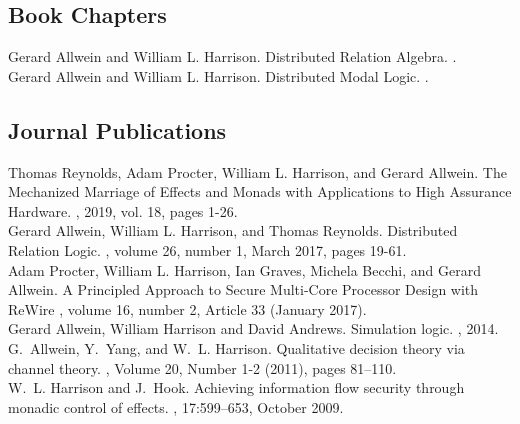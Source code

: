 \documentclass[12pt]{article} %
\begin{document}
\subsection*{Book Chapters}

Gerard Allwein and William L. Harrison.
\newblock Distributed Relation Algebra.
.
\\

Gerard Allwein and William L. Harrison.
\newblock Distributed Modal Logic.
.

\subsection*{Journal Publications}


Thomas Reynolds, Adam Procter, William L. Harrison, and Gerard Allwein.
\newblock The Mechanized Marriage of Effects and Monads with Applications to High Assurance Hardware.
, 2019, vol. 18, pages 1-26. 
\\


Gerard Allwein, William L. Harrison, and Thomas Reynolds.
\newblock Distributed Relation Logic.
, volume 26, number 1, March 2017, pages 19-61.
\\


Adam Procter, William L. Harrison, Ian Graves, Michela Becchi, and Gerard Allwein.
\newblock A Principled Approach to Secure Multi-Core Processor Design with ReWire
, volume 16, number 2, Article 33 (January 2017).
\\

Gerard Allwein, William Harrison and David Andrews.
\newblock Simulation logic.
, 2014.
\\

G.~Allwein, Y.~Yang, and W.~L. Harrison.
\newblock Qualitative decision theory via channel theory.
, Volume 20, Number 1-2 (2011), pages 81--110.
\\


W.~L. Harrison and J.~Hook.
\newblock Achieving information flow security through monadic control of
  effects.
, 17:599--653, October 2009.
\\
\end{document}
